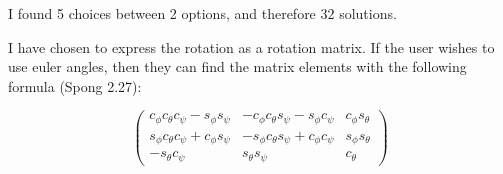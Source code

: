 \documentclass{article}
\begin{document}
I found 5 choices between 2 options, and therefore $32$ solutions.

I have chosen to express the rotation as a rotation matrix.
If the user wishes to use euler angles, then they can find the matrix
	elements with the following formula (Spong 2.27):

\[ \left( \begin{matrix}
	c_\phi c_\theta c_\psi - s_\phi s_\psi &
		-c_\phi c_\theta s_\psi - s_\phi c_\psi &
		c_\phi s_\theta \\
	s_\phi c_\theta c_\psi + c_\phi s_\psi &
		-s_\phi c_\theta s_\psi + c_\phi c_\psi & s_\phi s_\theta \\
	-s_\theta c_\psi & s_\theta s_\psi & c_\theta 
	\end{matrix} \right) \]
	
\end{document}

